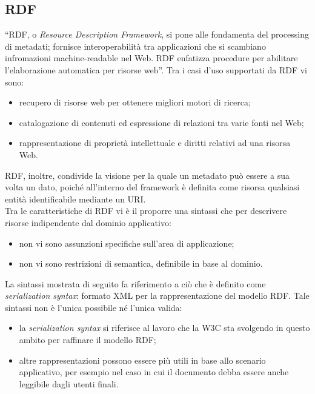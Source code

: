 \documentclass[12pt,a4paper,twoside]{book}
\begin{document}
\subsection{RDF}
``RDF, o \textit{Resource Description Framework}, si pone alle fondamenta del processing di metadati; fornisce interoperabilità tra applicazioni che si scambiano infromazioni machine-readable nel Web. RDF enfatizza procedure per abilitare l'elaborazione automatica per risorse web''\cite{RDF}. Tra i casi d'uso supportati da RDF vi sono:
\begin{itemize}
\item recupero di risorse web per ottenere migliori motori di ricerca;
\item catalogazione di contenuti ed espressione di relazioni tra varie fonti nel Web;
\item rappresentazione di proprietà intellettuale e diritti relativi ad una risorsa Web.
\end{itemize}
RDF, inoltre, condivide la visione per la quale un metadato può essere a sua volta un dato, poiché all'interno del framework è definita come risorsa qualsiasi entità identificabile mediante un URI.\\
Tra le caratteristiche di RDF vi è il proporre una sintassi che per descrivere risorse indipendente dal dominio applicativo: 
\begin{itemize}
\item non vi sono assunzioni specifiche sull'area di applicazione;
\item non vi sono restrizioni di semantica, definibile in base al dominio.
\end{itemize}
La sintassi mostrata di seguito fa riferimento a ciò che è definito come \textit{serialization syntax}: formato XML per la rappresentazione del modello RDF. Tale sintassi non è l'unica possibile né l'unica valida:
\begin{itemize}
\item la \textit{serialization syntax} si riferisce al lavoro che la W3C sta svolgendo in questo ambito per raffinare il modello RDF;
\item altre rappresentazioni possono essere più utili in base allo scenario applicativo, per esempio nel caso in cui il documento debba essere anche leggibile dagli utenti finali.
\end{itemize}
\end{document}
